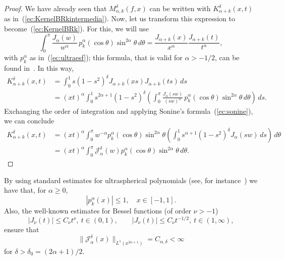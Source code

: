 \documentclass{amsart}
\theoremstyle{remark}
\newcommand{\Jad}[1][\delta]{\mathcal{J}_{\alpha}^{#1}}
\newcommand{\BRk}{M_{\alpha,k}^{\delta}}
\newcommand{\KBRk}{K_{\alpha+k}^{\delta}} %
\newcommand{\lpnorm}[2]{\|{#1}\|_{L^{#2}(x^{2\alpha+1})}}
\begin{document}
\begin{proof}
We have already seen that $\BRk(f,x)$ can be written with $\KBRk(x,t)$ as
in~(\ref{ec:KernelBRkintermedia}). Now, let us transform this expression to
become~(\ref{ec:KernelBRk}). For this, we will use
\begin{equation*}
    \int_0^{\pi}\frac{J_{\alpha}(w)}{w^{\alpha}} \,
      p^{\alpha}_k(\cos\theta) \sin^{2\alpha}\theta \, d\theta
    = \frac{J_{\alpha+k}(x)}{x^\alpha} \frac{J_{\alpha+k}(t)}{t^{\alpha}},
\end{equation*}
with $p_k^\alpha$ as in~(\ref{ec:ultraesf}); this formula, that
is valid for $\alpha>-1/2$, can be found in~\cite[\S~11.41, p.~367]{Wat}.
In this way,
\begin{align*}
    K_{\alpha+k}^{\delta}(x,t)
      &= \int_0^1 s(1-s^2)^\delta J_{\alpha+k}(xs)J_{\alpha+k}(ts)\,ds \\
      &= (xt)^\alpha
        \int_0^1 s^{2\alpha+1}(1-s^2)^{\delta}
          \left( \int_0^{\pi} \frac{J_{\alpha}(sw)}{(sw)^{\alpha}}
            \, p^{\alpha}_k(\cos\theta)
            \sin^{2\alpha}\theta \, d\theta \right) \, ds.
\end{align*}
Exchanging the order of integration and applying Sonine's
formula~(\ref{ec:sonine}), we can conclude
\begin{align*}
    \KBRk(x,t)
      &= (xt)^\alpha \int_0^{\pi} w^{-\alpha}
         p^{\alpha}_k(\cos\theta) \sin^{2\alpha}\theta
         \left( \int_0^1 s^{\alpha+1}(1-s^2)^{\delta}
            J_{\alpha}(sw) \,ds \right) \, d\theta \\
     &= (xt)^{\alpha}
        \int_0^{\pi} \Jad(w)
            p^{\alpha}_k(\cos\theta) \sin^{2\alpha}\theta \, d\theta.
\end{align*}
\end{proof}

By using standard estimates for ultraspherical polynomials (see, for
instance~\cite[Th.~7.33.1]{Sze}) we have that, for $\alpha \ge 0$,
\begin{equation}
\label{ec:cotaUltraesf}
    |p^\alpha_k(x)| \le 1, \quad x \in [-1,1].
\end{equation}
Also, the well-known estimates for Bessel functions (of order $\nu>-1$)
\begin{equation*}
    |J_\nu(t)| \le C_\nu t^\nu, \ t \in (0,1),
    \qquad
    |J_\nu(t)| \le C_\nu t^{-1/2}, \ t \in (1,\infty),
\end{equation*}
ensure that
\begin{equation}
\label{ec:cotajad}
    \lpnorm{\Jad(x)}{1} = C_{\alpha,\delta} < \infty
\end{equation}
for $\delta > \delta_0 = (2\alpha+1)/2$.
\end{document}
